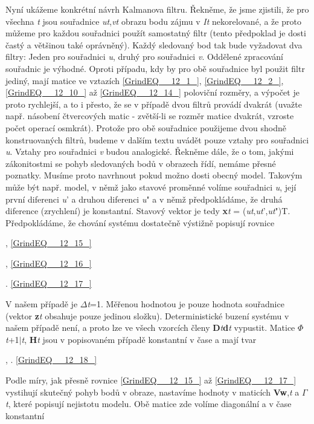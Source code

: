 \noindent 

\noindent 

\noindent Nyní ukážeme konkrétní návrh Kalmanova filtru. Řekněme, že jsme zjistili, že pro všechna \textit{t} jsou souřadnice \textit{ut},\textit{vt} obrazu bodu zájmu v \textit{It} nekorelované, a že proto můžeme pro každou souřadnici použít samostatný filtr (tento předpoklad je dosti častý a většinou také oprávněný). Každý sledovaný bod tak bude vyžadovat dva filtry: Jeden pro souřadnici \textit{u}, druhý pro souřadnici \textit{v}. Oddělené zpracování souřadnic je výhodné. Oproti případu, kdy by pro obě souřadnice byl použit filtr jediný, mají matice ve vztazích \eqref{GrindEQ__12_1_}, \eqref{GrindEQ__12_2_}, \eqref{GrindEQ__12_10_} až \eqref{GrindEQ__12_14_} poloviční rozměry, a výpočet je proto rychlejší, a to i přesto, že se v případě dvou filtrů provádí dvakrát (uvažte např. násobení čtvercových matic - zvětší-li se rozměr matice dvakrát, vzroste počet operací osmkrát). Protože pro obě souřadnice použijeme dvou shodně konstruovaných filtrů, budeme v dalším textu uvádět pouze vztahy pro souřadnici \textit{u}. Vztahy pro souřadnici \textit{v} budou analogické. Řekněme dále, že o tom, jakými zákonitostmi se pohyb sledovaných bodů v obrazech řídí, nemáme přesné poznatky. Musíme proto navrhnout pokud možno dosti obecný model. Takovým může být např. model, v němž jako stavové proměnné volíme souřadnici \textit{u}, její první diferenci \textit{u}' a druhou diferenci \textit{u}" a v němž předpokládáme, že druhá diference (zrychlení) je konstantní. Stavový vektor je tedy \textbf{x}\textit{t} = (\textit{ut},\textit{ut}',\textit{ut}")T. Předpokládáme, že chování systému dostatečně výstižně popisují rovnice 

 , \eqref{GrindEQ__12_15_}

 , \eqref{GrindEQ__12_16_}

 . \eqref{GrindEQ__12_17_}

\noindent V našem případě je $\Delta$\textit{t}=1. Měřenou hodnotou je pouze hodnota souřadnice (vektor \textbf{z}\textit{t} obsahuje pouze jedinou složku). Deterministické buzení systému v našem případě není, a proto lze ve všech vzorcích členy \textbf{D}\textit{t}\textbf{d}\textit{t} vypustit. Matice \textbf{$\Phi$}\textit{t}+1$\mid$\textit{t}, \textbf{H}\textit{t} jsou v popisovaném případě konstantní v čase a mají tvar

 ,     . \eqref{GrindEQ__12_18_}

\noindent Podle míry, jak přesně rovnice \eqref{GrindEQ__12_15_} až \eqref{GrindEQ__12_17_} vystihují skutečný pohyb bodů v obraze, nastavíme hodnoty v maticích \textbf{Vw},\textit{t} a \textbf{$\Gamma$}\textit{t}, které popisují nejistotu modelu. Obě matice zde volíme diagonální a v čase konstantní

